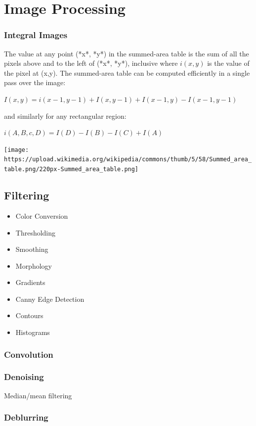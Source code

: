 \chapter{Image Processing}

\subsection{Integral Images}

The value at any point (*x*, *y*) in the summed-area table is the sum of all the pixels above and to the left of (*x*, *y*), inclusive where $i(x,y)$  is the value of the pixel at (x,y). The summed-area table can be computed efficiently in a single pass over the image:

$I(x,y) = i(x-1,y-1) + I(x,y-1) + I(x-1,y)-I(x-1,y-1)$

and similarly for any rectangular region:

$ i(A,B,c,D) = I(D) - I(B) - I(C)+I(A)$

\texttt{[image: https://upload.wikimedia.org/wikipedia/commons/thumb/5/58/Summed\_area\_table.png/220px-Summed\_area\_table.png]}

\section{ Filtering}
\begin{itemize}
\item Color Conversion
\item Thresholding
\item Smoothing
\item Morphology
\item Gradients
\item Canny Edge Detection
\item Contours
\item Histograms
\end{itemize}

\subsection{Convolution}

\subsection{Denoising}

Median/mean filtering

\subsection{Deblurring}

